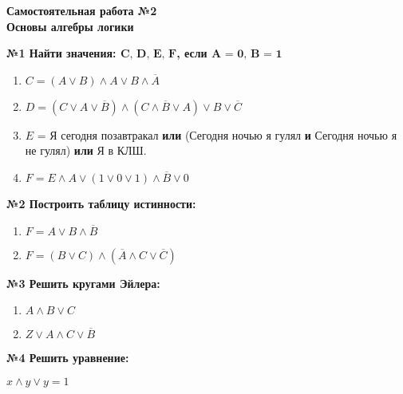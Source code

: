 



    \begin{center}
        \textbf{
            Самостоятельная работа №2\\
            Основы алгебры логики}
    \end{center}

    \begin{center}
        \textbf{№1 Найти значения: $\textbf{C, D, E, F}$, если $\textbf{A = 0, B = 1}$}
    \end{center}

    \begin{enumerate}
        \item $C = (A \vee B) \wedge A \vee B \wedge \overline A$

        \item $D = (C \vee A \vee \overline B) \wedge (C \wedge \overline B \vee A) \vee B \vee \overline C$

        \item $E$ = Я сегодня позавтракал \textbf{или} (Сегодня ночью я гулял \textbf{и} Сегодня ночью я не гулял) \textbf{или} Я в КЛШ.

        \item $F = E \wedge A \vee (1 \vee 0 \vee 1) \wedge \overline B \vee 0$\\

    \end{enumerate}

    \begin{center}
        \textbf{№2 Построить таблицу истинности:}
    \end{center}

    \begin{enumerate}
        \item $F = A \vee B \wedge \overline B$

        \item $F = (B \vee C) \wedge (\overline A \wedge C \vee \overline C)$
    \end{enumerate}

    \begin{center}
        \textbf{№3 Решить кругами Эйлера:}
    \end{center}

    \begin{enumerate}
        \item $A \wedge B \vee C$

        \item $Z \vee A \wedge C \vee \overline B$
    \end{enumerate}

    \begin{center}
        \textbf{№4 Решить уравнение:}
    \end{center}

    $x \wedge y \vee y = 1$

